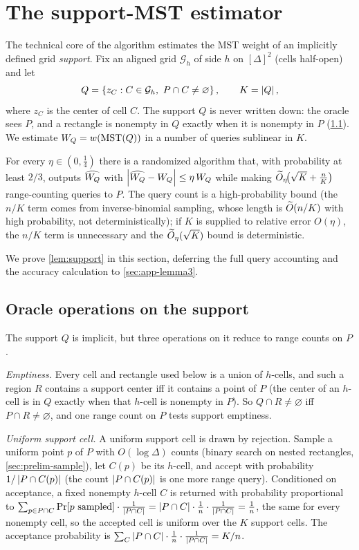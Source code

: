 \section{The support-MST estimator}\label{sec:support}

The technical core of the algorithm estimates the MST weight of an implicitly defined grid \emph{support}.
Fix an aligned grid $\mathcal G_h$ of side $h$ on $[\Delta]^2$ (cells half-open) and let
\[
  Q=\left\{z_C : C\in\mathcal G_h,\ P\cap C\ne\varnothing\right\},\qquad K=\left|Q\right|,
\]
where $z_C$ is the center of cell $C$. The support $Q$ is never written down: the oracle sees $P$, and a
rectangle is nonempty in $Q$ exactly when it is nonempty in $P$ (\cref{sec:support-oracle}). We estimate
$W_Q=w(\mathrm{MST}(Q))$ in a number of queries sublinear in $K$.

\begin{lemma}\label{lem:support}
For every $\eta\in(0,\tfrac14)$ there is a randomized algorithm that, with probability at least $2/3$,
outputs $\widehat{W_Q}$ with $\left|\widehat{W_Q}-W_Q\right|\le\eta\,W_Q$ while making $\widetilde{O}_\eta\!\bigl(\sqrt
K+\tfrac nK\bigr)$ range-counting queries to $P$. The query count is a high-probability bound (the $n/K$
term comes from inverse-binomial sampling, whose length is $\widetilde{O}(n/K)$ with high probability, not
deterministically); if $K$ is supplied to relative error $O(\eta)$, the $n/K$ term is unnecessary and the
$\widetilde{O}_\eta(\sqrt K)$ bound is deterministic.
\end{lemma}

We prove \cref{lem:support} in this section, deferring the full query accounting and the accuracy
calculation to \cref{sec:app-lemma3}.

\subsection{Oracle operations on the support}\label{sec:support-oracle}

The support $Q$ is implicit, but three operations on it reduce to range counts on $P$.

\emph{Emptiness.} Every cell and rectangle used below is a union of $h$-cells, and such a region $R$
contains a support center iff it contains a point of $P$ (the center of an $h$-cell is in $Q$ exactly when
that $h$-cell is nonempty in $P$). So $Q\cap R\ne\varnothing$ iff $P\cap R\ne\varnothing$, and one range
count on $P$ tests support emptiness.

\emph{Uniform support cell.} A uniform support cell is drawn by rejection. Sample a uniform point $p$ of
$P$ with $O(\log\Delta)$ counts (binary search on nested rectangles, \cref{sec:prelim-sample}), let $C(p)$
be its $h$-cell, and accept with probability $1/\left|P\cap C(p)\right|$ (the count $\left|P\cap C(p)\right|$ is one more
range query). Conditioned on acceptance, a fixed nonempty $h$-cell $C$ is returned with probability
proportional to $\sum_{p\in P\cap C}\Pr[p\text{ sampled}]\cdot\tfrac1{\left|P\cap C\right|}=\left|P\cap C\right|\cdot
\tfrac1n\cdot\tfrac1{\left|P\cap C\right|}=\tfrac1n$, the same for every nonempty cell, so the accepted cell is
uniform over the $K$ support cells. The acceptance probability is $\sum_{C}\left|P\cap C\right|\cdot\tfrac1n\cdot
\tfrac1{\left|P\cap C\right|}=K/n$.

